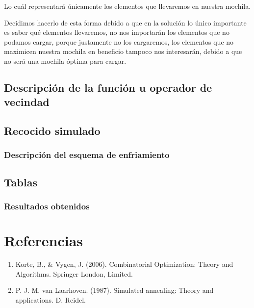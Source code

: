 \documentclass{article}
\begin{document}
Lo cuál representará únicamente los elementos que llevaremos en nuestra mochila.

Decidimos hacerlo de esta forma debido a que en la solución lo único importante es saber qué elementos llevaremos, no nos importarán los elementos que no podamos cargar, porque justamente no los cargaremos, los elementos que no maximicen nuestra mochila en beneficio tampoco nos interesarán, debido a que no será una mochila óptima para cargar.

\subsection*{Descripción de la función u operador de vecindad}

\subsection*{Recocido simulado}

\subsubsection*{Descripción del esquema de enfriamiento}

\subsection*{Tablas}

\subsubsection*{Resultados obtenidos}

\newpage
\section*{Referencias}
\begin{enumerate}
	\item Korte, B., \& Vygen, J. (2006). Combinatorial Optimization: Theory and Algorithms. Springer London, Limited.
	\item P. J. M. van Laarhoven. (1987). Simulated annealing: Theory and applications. D. Reidel.
\end{enumerate}
\end{document}
